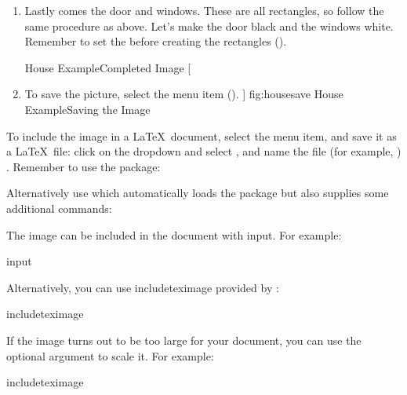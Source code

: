 \begin{enumerate}
[]
{
 {fig:house2a}{}{},
 {fig:house2b}{}{}
}
[House Example\dash Creating a Triangle]
{House Example\dash creating a triangle:
 triangle under construction,
 completed triangle.}

\item Lastly comes the door and windows. These are all
rectangles, so follow the same procedure as above.
Let's make the door black and the windows white.
Remember to set the  before creating the rectangles
().

{}
{House Example\dash Completed Image}
[
\item To save the picture, select the 
menu item ().
]
{fig:housesave}
{}
{House Example\dash Saving the Image}

\end{enumerate}

To include the image in a \LaTeX\ document, select the
 menu item, and save it as a
\LaTeX\ file: click on the  \gls{dropdown} and
select , and name the file
(for example, )
. Remember to use the
 package:
\begin{codebox}
\end{codebox}
Alternatively use  which automatically loads
the  package but also supplies some additional commands:
\begin{codebox}
\end{codebox}
The image can be included in the document with \gls{input}. For
example:
\begin{codebox}
\gls{input}
\end{codebox}
Alternatively, you can use \gls{includeteximage} provided by
:
\begin{codebox}
\gls{includeteximage}
\end{codebox}
If the image turns out to be too large for your document, you can
use the optional argument to scale it. For example:
\begin{codebox}
\gls{includeteximage}
\end{codebox}

